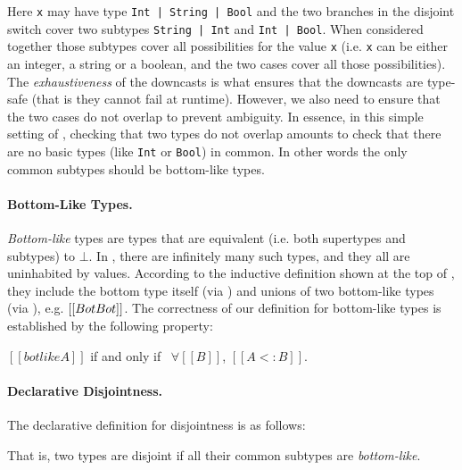 \noindent Here \lstinline{x} may have type \lstinline{Int | String | Bool}
and the two branches in the disjoint switch cover two subtypes
\lstinline{String | Int} and \lstinline{Int | Bool}. When considered
together those subtypes cover all possibilities for the value \lstinline{x} (i.e.
\lstinline{x} can be either an integer, a string or a boolean, and the two cases
cover all those possibilities). The \emph{exhaustiveness} of the downcasts
is what ensures that the downcasts are type-safe (that is they cannot fail
at runtime). However, we also need to ensure that the two cases do not overlap
to prevent ambiguity. In essence, in this simple setting of \name, checking
that two types do not overlap amounts to check that there are no
basic types (like \lstinline{Int} or \lstinline{Bool}) in common.
In other words the only common subtypes should be bottom-like types.

\paragraph*{Bottom-Like Types.}
\emph{Bottom-like} types are types that are equivalent (i.e.  both
supertypes and subtypes) to $\bot$. In \name, there are infinitely
many such types, and they all are uninhabited by values.
According to the inductive definition shown at the top of
, they include the bottom type itself (via
) and unions of two bottom-like types (via ),
e.g. $[[Bot \/ Bot]]$.
The correctness of our definition for bottom-like types is
established by the following property:

\begin{lemma}
  $[[botlike A]]$ if and only if \ $\forall [[B]]$, $[[A <: B]]$.
\label{lemma:union:bl-soundness}
\end{lemma}

\paragraph*{Declarative Disjointness.}
The declarative definition for disjointness is as follows:


\noindent That is, two types are disjoint if all their common subtypes are \emph{bottom-like}.

